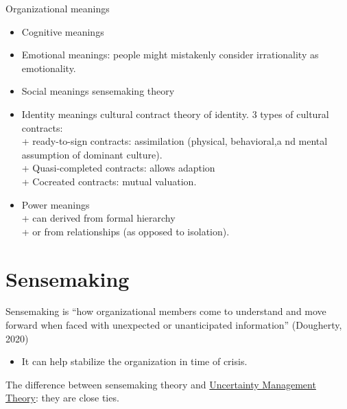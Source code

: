 \documentclass[
]{book}
\providecommand{\tightlist}{%
  \setlength{\itemsep}{0pt}\setlength{\parskip}{0pt}}
\begin{document}
Organizational meanings

\begin{itemize}
\tightlist
\item
  Cognitive meanings\\
\item
  Emotional meanings: people might mistakenly consider irrationality as emotionality.\\
\item
  Social meanings sensemaking theory\\
\item
  Identity meanings cultural contract theory of identity. 3 types of cultural contracts:\\
  + ready-to-sign contracts: assimilation (physical, behavioral,a nd mental assumption of dominant culture).\\
  + Quasi-completed contracts: allows adaption\\
  + Cocreated contracts: mutual valuation.\\
\item
  Power meanings\\
  + can derived from formal hierarchy\\
  + or from relationships (as opposed to isolation).
\end{itemize}

\hypertarget{sensemaking}{%
\chapter{Sensemaking}\label{sensemaking}}

Sensemaking is ``how organizational members come to understand and move forward when faced with unexpected or
unanticipated information'' (Dougherty, 2020)

\begin{itemize}
\tightlist
\item
  It can help stabilize the organization in time of crisis.
\end{itemize}

The difference between sensemaking theory and \protect\hyperlink{uncertainty-management-theory}{Uncertainty Management Theory}: they are close ties.
\end{document}
